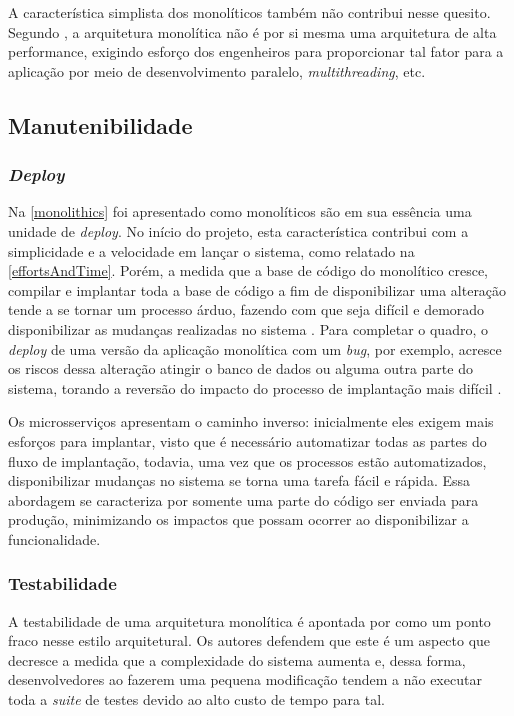 A característica simplista dos monolíticos também não contribui nesse quesito. Segundo
, a arquitetura monolítica não é por si
mesma uma arquitetura de alta performance, exigindo esforço dos engenheiros para proporcionar
tal fator para a aplicação por meio de desenvolvimento paralelo, \textit{multithreading}, etc.

\subsection{Manutenibilidade}

\subsubsection{\textit{Deploy}}
Na \autoref{monolithics} foi apresentado como monolíticos são em sua essência uma unidade de
\textit{deploy}. No início do projeto, esta característica contribui com a simplicidade e a
velocidade em lançar o sistema, como relatado na \autoref{effortsAndTime}. Porém, a medida que a
base de código do monolítico cresce, compilar e implantar toda a base de código a fim de
disponibilizar uma alteração tende a se tornar um processo árduo, fazendo com que seja difícil e
demorado disponibilizar as mudanças realizadas no sistema \cite{MartinFowler:Microservices}. Para
completar o quadro, o \textit{deploy} de uma versão da aplicação monolítica com um \textit{bug},
por exemplo, acresce os riscos dessa alteração atingir o banco de dados ou alguma outra parte do
sistema, torando a reversão do impacto do processo de implantação mais difícil
\cite{Richards2020:FundamentalsOfSoftwareArchitecture}.

Os microsserviços apresentam o caminho inverso: inicialmente eles exigem mais esforços para
implantar, visto que é necessário automatizar todas as partes do fluxo de implantação, todavia, uma
vez que os processos estão automatizados, disponibilizar mudanças no sistema se torna uma tarefa
fácil e rápida. Essa abordagem se caracteriza por somente uma parte do código ser enviada para
produção, minimizando os impactos que possam ocorrer ao disponibilizar a funcionalidade.

\subsubsection{Testabilidade}
\label{testabilidade}

A testabilidade de uma arquitetura monolítica é apontada por 
como um ponto fraco nesse estilo arquitetural. Os autores defendem que este é um aspecto que decresce a
medida que a complexidade do sistema aumenta e, dessa forma, desenvolvedores ao fazerem uma pequena
modificação tendem a não executar toda a \textit{suite} de testes devido ao alto custo de tempo para
tal.

